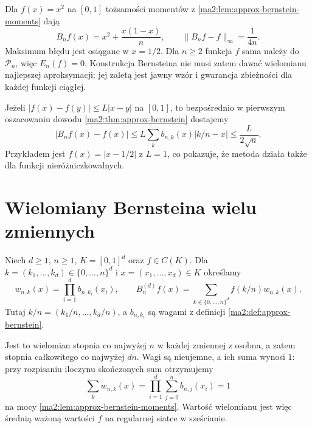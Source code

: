 \begin{przyklad}
\label{ma2:ex:approx-bernstein-square}
Dla $f(x)=x^2$ na $[0,1]$ tożsamości momentów
z \ref{ma2:lem:approx-bernstein-moments} dają
\[
 B_nf(x)=x^2+\frac{x(1-x)}n,\qquad
 \|B_nf-f\|_\infty=\frac1{4n}.
\]
Maksimum błędu jest osiągane w $x=1/2$.
Dla $n\ge2$ funkcja $f$ sama należy do $\mathcal P_n$,
więc $E_n(f)=0$. Konstrukcja Bernsteina
nie musi zatem dawać wielomianu najlepszej
aproksymacji; jej zaletą jest jawny wzór
i gwarancja zbieżności dla każdej funkcji ciągłej.
\end{przyklad}

\begin{przyklad}
\label{ma2:ex:approx-bernstein-lipschitz}
Jeżeli $|f(x)-f(y)|\le L|x-y|$ na $[0,1]$,
to bezpośrednio w pierwszym oszacowaniu dowodu
\ref{ma2:thm:approx-bernstein} dostajemy
\[
 |B_nf(x)-f(x)|\le
 L\sum_k b_{n,k}(x)|k/n-x|
 \le\frac{L}{2\sqrt n}.
\]
Przykładem jest $f(x)=|x-1/2|$ z $L=1$,
co pokazuje, że metoda działa także
dla funkcji nieróżniczkowalnych.
\end{przyklad}

\section{Wielomiany Bernsteina wielu zmiennych}

\begin{definicja}
\label{ma2:def:approx-bernstein-multi}
Niech $d\ge1$, $n\ge1$, $K=[0,1]^d$ oraz $f\in C(K)$.
Dla $k=(k_1,\ldots,k_d)\in\{0,\ldots,n\}^d$
i $x=(x_1,\ldots,x_d)\in K$ określamy
\[
 w_{n,k}(x)=\prod_{i=1}^d b_{n,k_i}(x_i),
 \qquad
 B_n^{(d)}f(x)=
 \sum_{k\in\{0,\ldots,n\}^d}f(k/n)w_{n,k}(x).
\]
Tutaj $k/n=(k_1/n,\ldots,k_d/n)$, a $b_{n,k_i}$
są wagami z definicji \ref{ma2:def:approx-bernstein}.
\end{definicja}

Jest to wielomian stopnia co najwyżej $n$
w każdej zmiennej z osobna, a zatem stopnia
całkowitego co najwyżej $dn$.
Wagi są nieujemne, a ich suma wynosi $1$:
przy rozpisaniu iloczynu skończonych sum
otrzymujemy
\[
 \sum_k w_{n,k}(x)
 =\prod_{i=1}^d\sum_{j=0}^n b_{n,j}(x_i)=1
\]
na mocy \ref{ma2:lem:approx-bernstein-moments}.
Wartość wielomianu jest więc średnią ważoną
wartości $f$ na regularnej siatce w sześcianie.

